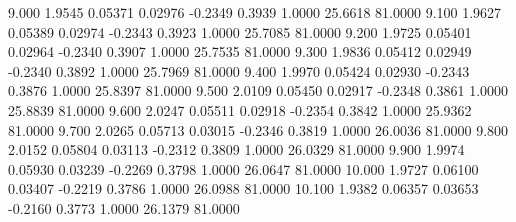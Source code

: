    9.000   1.9545   0.05371   0.02976  -0.2349   0.3939   1.0000  25.6618  81.0000
   9.100   1.9627   0.05389   0.02974  -0.2343   0.3923   1.0000  25.7085  81.0000
   9.200   1.9725   0.05401   0.02964  -0.2340   0.3907   1.0000  25.7535  81.0000
   9.300   1.9836   0.05412   0.02949  -0.2340   0.3892   1.0000  25.7969  81.0000
   9.400   1.9970   0.05424   0.02930  -0.2343   0.3876   1.0000  25.8397  81.0000
   9.500   2.0109   0.05450   0.02917  -0.2348   0.3861   1.0000  25.8839  81.0000
   9.600   2.0247   0.05511   0.02918  -0.2354   0.3842   1.0000  25.9362  81.0000
   9.700   2.0265   0.05713   0.03015  -0.2346   0.3819   1.0000  26.0036  81.0000
   9.800   2.0152   0.05804   0.03113  -0.2312   0.3809   1.0000  26.0329  81.0000
   9.900   1.9974   0.05930   0.03239  -0.2269   0.3798   1.0000  26.0647  81.0000
  10.000   1.9727   0.06100   0.03407  -0.2219   0.3786   1.0000  26.0988  81.0000
  10.100   1.9382   0.06357   0.03653  -0.2160   0.3773   1.0000  26.1379  81.0000
